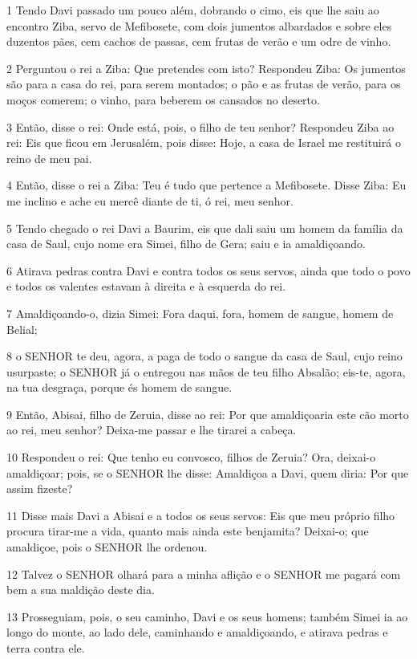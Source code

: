 \par 1 Tendo Davi passado um pouco além, dobrando o cimo, eis que lhe saiu ao encontro Ziba, servo de Mefibosete, com dois jumentos albardados e sobre eles duzentos pães, cem cachos de passas, cem frutas de verão e um odre de vinho.
\par 2 Perguntou o rei a Ziba: Que pretendes com isto? Respondeu Ziba: Os jumentos são para a casa do rei, para serem montados; o pão e as frutas de verão, para os moços comerem; o vinho, para beberem os cansados no deserto.
\par 3 Então, disse o rei: Onde está, pois, o filho de teu senhor? Respondeu Ziba ao rei: Eis que ficou em Jerusalém, pois disse: Hoje, a casa de Israel me restituirá o reino de meu pai.
\par 4 Então, disse o rei a Ziba: Teu é tudo que pertence a Mefibosete. Disse Ziba: Eu me inclino e ache eu mercê diante de ti, ó rei, meu senhor.
\par 5 Tendo chegado o rei Davi a Baurim, eis que dali saiu um homem da família da casa de Saul, cujo nome era Simei, filho de Gera; saiu e ia amaldiçoando.
\par 6 Atirava pedras contra Davi e contra todos os seus servos, ainda que todo o povo e todos os valentes estavam à direita e à esquerda do rei.
\par 7 Amaldiçoando-o, dizia Simei: Fora daqui, fora, homem de sangue, homem de Belial;
\par 8 o SENHOR te deu, agora, a paga de todo o sangue da casa de Saul, cujo reino usurpaste; o SENHOR já o entregou nas mãos de teu filho Absalão; eis-te, agora, na tua desgraça, porque és homem de sangue.
\par 9 Então, Abisai, filho de Zeruia, disse ao rei: Por que amaldiçoaria este cão morto ao rei, meu senhor? Deixa-me passar e lhe tirarei a cabeça.
\par 10 Respondeu o rei: Que tenho eu convosco, filhos de Zeruia? Ora, deixai-o amaldiçoar; pois, se o SENHOR lhe disse: Amaldiçoa a Davi, quem diria: Por que assim fizeste?
\par 11 Disse mais Davi a Abisai e a todos os seus servos: Eis que meu próprio filho procura tirar-me a vida, quanto mais ainda este benjamita? Deixai-o; que amaldiçoe, pois o SENHOR lhe ordenou.
\par 12 Talvez o SENHOR olhará para a minha aflição e o SENHOR me pagará com bem a sua maldição deste dia.
\par 13 Prosseguiam, pois, o seu caminho, Davi e os seus homens; também Simei ia ao longo do monte, ao lado dele, caminhando e amaldiçoando, e atirava pedras e terra contra ele.
